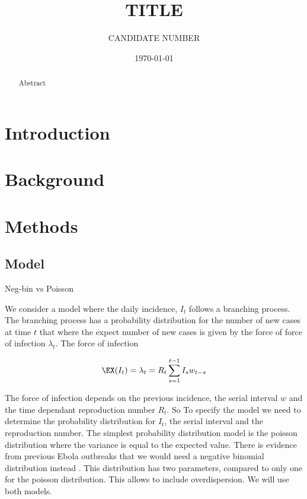 \documentclass[12pt]{article}
\title{TITLE}
\author{
  CANDIDATE NUMBER
}
\date{\today}
\begin{document}
\maketitle

\begin{abstract}
  Abstract

\end{abstract}

\newpage

\tableofcontents

\section{Introduction}
\cite{funkAssessingPerformanceRealtime2018}


\section{Background}

\section{Methods}

\subsection{Model}


Neg-bin vs Poisson


We consider a model where the daily incidence, $I_t$ follows a branching process. The branching process has a probability distribution for the number of new cases at time $t$ that where the expect number of new cases is given by the force of force of infection $\lambda_t$. The force of infection 

\[ \EX(I_t) = \lambda_t =  R_t \sum^{t-1}_{s=1} I_s w_{t-s}\]

The force of infection depends on the previous incidence, the serial interval $w$ and the time dependant reproduction number $R_t$. So To specify the model we need to determine the probability distribution for $I_t$, the serial interval and the reproduction number. The simplest probability distribution model is the poisson distribution where the variance is equal to the expected value. There is evidence from previous Ebola outbreaks that we would need a negative binomial distribution instead \cite{internationalebolaresponseteamExposurePatternsDriving2016,OutbreakEbolaVirus }. This distribution has two parameters, compared to only one for the poisson distribution. This allows to include overdispersion. We will use both models.
\end{document}

